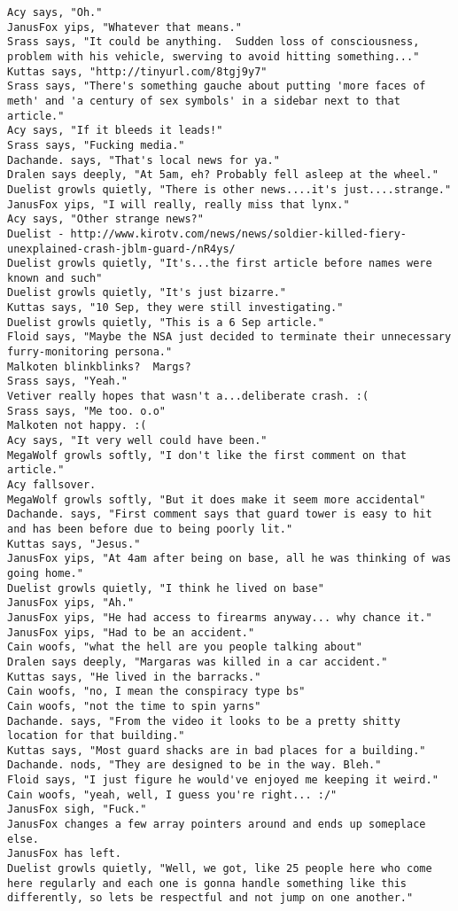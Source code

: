 \begin{verbatim}
Acy says, "Oh."
JanusFox yips, "Whatever that means."
Srass says, "It could be anything.  Sudden loss of consciousness, problem with his vehicle, swerving to avoid hitting something..."
Kuttas says, "http://tinyurl.com/8tgj9y7"
Srass says, "There's something gauche about putting 'more faces of meth' and 'a century of sex symbols' in a sidebar next to that article."
Acy says, "If it bleeds it leads!"
Srass says, "Fucking media."
Dachande. says, "That's local news for ya."
Dralen says deeply, "At 5am, eh? Probably fell asleep at the wheel."
Duelist growls quietly, "There is other news....it's just....strange."
JanusFox yips, "I will really, really miss that lynx."
Acy says, "Other strange news?"
Duelist - http://www.kirotv.com/news/news/soldier-killed-fiery-unexplained-crash-jblm-guard-/nR4ys/
Duelist growls quietly, "It's...the first article before names were known and such"
Duelist growls quietly, "It's just bizarre."
Kuttas says, "10 Sep, they were still investigating."
Duelist growls quietly, "This is a 6 Sep article."
Floid says, "Maybe the NSA just decided to terminate their unnecessary furry-monitoring persona."
Malkoten blinkblinks?  Margs?
Srass says, "Yeah."
Vetiver really hopes that wasn't a...deliberate crash. :(
Srass says, "Me too. o.o"
Malkoten not happy. :(
Acy says, "It very well could have been."
MegaWolf growls softly, "I don't like the first comment on that article."
Acy fallsover.
MegaWolf growls softly, "But it does make it seem more accidental"
Dachande. says, "First comment says that guard tower is easy to hit and has been before due to being poorly lit."
Kuttas says, "Jesus."
JanusFox yips, "At 4am after being on base, all he was thinking of was going home."
Duelist growls quietly, "I think he lived on base"
JanusFox yips, "Ah."
JanusFox yips, "He had access to firearms anyway... why chance it."
JanusFox yips, "Had to be an accident."
Cain woofs, "what the hell are you people talking about"
Dralen says deeply, "Margaras was killed in a car accident."
Kuttas says, "He lived in the barracks."
Cain woofs, "no, I mean the conspiracy type bs"
Cain woofs, "not the time to spin yarns"
Dachande. says, "From the video it looks to be a pretty shitty location for that building."
Kuttas says, "Most guard shacks are in bad places for a building."
Dachande. nods, "They are designed to be in the way. Bleh."
Floid says, "I just figure he would've enjoyed me keeping it weird."
Cain woofs, "yeah, well, I guess you're right... :/"
JanusFox sigh, "Fuck."
JanusFox changes a few array pointers around and ends up someplace else.
JanusFox has left.
Duelist growls quietly, "Well, we got, like 25 people here who come here regularly and each one is gonna handle something like this differently, so lets be respectful and not jump on one another."

\end{verbatim}
